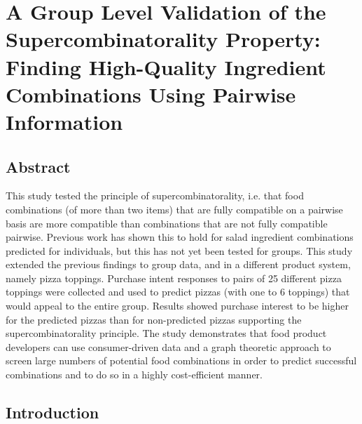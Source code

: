 \chapter{A Group Level Validation of the Supercombinatorality Property: Finding High-Quality Ingredient Combinations Using Pairwise Information}

\section{Abstract}

This study tested the principle of supercombinatorality,  i.e. that food combinations (of more than two items) that are fully compatible on a pairwise basis are more compatible than combinations that are not fully compatible pairwise.  Previous work has shown this to hold for salad ingredient combinations predicted for individuals, but this has not yet been tested for groups.  This study extended the previous findings to group data, and in a different product system, namely pizza toppings.  Purchase intent responses to pairs of 25 different pizza toppings were collected and used to predict pizzas (with one to 6 toppings) that would appeal to the entire group.  Results showed purchase interest to be higher for the predicted pizzas than for non-predicted pizzas supporting the supercombinatorality principle.  The study demonstrates that food product developers can use consumer-driven data and a graph theoretic approach to screen large numbers of potential food combinations in order to predict successful combinations and to do so in a highly cost-efficient manner.

\section{Introduction}

